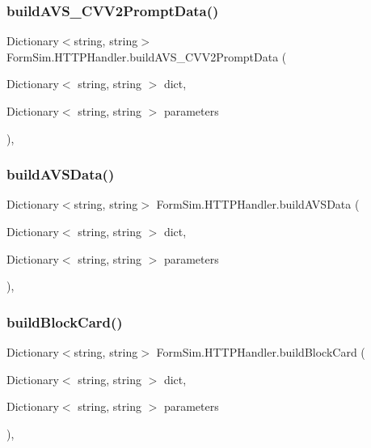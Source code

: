 \subsubsection{\texorpdfstring{build\+A\+V\+S\+\_\+\+C\+V\+V2\+Prompt\+Data()}{buildAVS\_CVV2PromptData()}}
{\footnotesize\ttfamily Dictionary$<$string, string$>$ Form\+Sim.\+H\+T\+T\+P\+Handler.\+build\+A\+V\+S\+\_\+\+C\+V\+V2\+Prompt\+Data (\begin{DoxyParamCaption}\item[{Dictionary$<$ string, string $>$}]{dict,  }\item[{Dictionary$<$ string, string $>$}]{parameters }\end{DoxyParamCaption})\hspace{0.3cm}{\ttfamily [inline]}, {\ttfamily [private]}}

\mbox{\label{class_form_sim_1_1_h_t_t_p_handler_ae36d78f08bb69c27da7e0c5d73b60db7}} 
\subsubsection{\texorpdfstring{build\+A\+V\+S\+Data()}{buildAVSData()}}
{\footnotesize\ttfamily Dictionary$<$string, string$>$ Form\+Sim.\+H\+T\+T\+P\+Handler.\+build\+A\+V\+S\+Data (\begin{DoxyParamCaption}\item[{Dictionary$<$ string, string $>$}]{dict,  }\item[{Dictionary$<$ string, string $>$}]{parameters }\end{DoxyParamCaption})\hspace{0.3cm}{\ttfamily [inline]}, {\ttfamily [private]}}

\mbox{\label{class_form_sim_1_1_h_t_t_p_handler_aa4d588b33663ae43ed124608bb0b2492}} 
\subsubsection{\texorpdfstring{build\+Block\+Card()}{buildBlockCard()}}
{\footnotesize\ttfamily Dictionary$<$string, string$>$ Form\+Sim.\+H\+T\+T\+P\+Handler.\+build\+Block\+Card (\begin{DoxyParamCaption}\item[{Dictionary$<$ string, string $>$}]{dict,  }\item[{Dictionary$<$ string, string $>$}]{parameters }\end{DoxyParamCaption})\hspace{0.3cm}{\ttfamily [inline]}, {\ttfamily [private]}}

